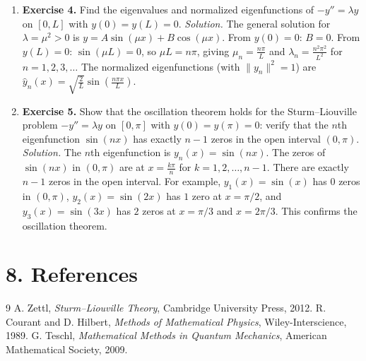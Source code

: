 \begin{enumerate}[leftmargin=*,itemsep=0.9em]
\item \textbf{Exercise 4.} Find the eigenvalues and normalized eigenfunctions of $-y'' = \lambda y$ on $[0, L]$ with $y(0) = y(L) = 0$. \emph{Solution.} The general solution for $\lambda = \mu^2 > 0$ is $y = A\sin(\mu x) + B\cos(\mu x)$. From $y(0) = 0$: $B = 0$. From $y(L) = 0$: $\sin(\mu L) = 0$, so $\mu L = n\pi$, giving $\mu_n = \frac{n\pi}{L}$ and $\lambda_n = \frac{n^2\pi^2}{L^2}$ for $n = 1, 2, 3, \ldots$ The normalized eigenfunctions (with $\|y_n\|^2 = 1$) are $\hat{y}_n(x) = \sqrt{\frac{2}{L}}\sin\!\left(\frac{n\pi x}{L}\right)$.

\item \textbf{Exercise 5.} Show that the oscillation theorem holds for the Sturm--Liouville problem $-y'' = \lambda y$ on $[0, \pi]$ with $y(0) = y(\pi) = 0$: verify that the $n$th eigenfunction $\sin(nx)$ has exactly $n - 1$ zeros in the open interval $(0, \pi)$. \emph{Solution.} The $n$th eigenfunction is $y_n(x) = \sin(nx)$. The zeros of $\sin(nx)$ in $(0, \pi)$ are at $x = \frac{k\pi}{n}$ for $k = 1, 2, \ldots, n - 1$. There are exactly $n - 1$ zeros in the open interval. For example, $y_1(x) = \sin(x)$ has $0$ zeros in $(0,\pi)$, $y_2(x) = \sin(2x)$ has $1$ zero at $x = \pi/2$, and $y_3(x) = \sin(3x)$ has $2$ zeros at $x = \pi/3$ and $x = 2\pi/3$. This confirms the oscillation theorem.

\end{enumerate}
\section*{8. References}
\begin{thebibliography}{9}
 A. Zettl, \emph{Sturm--Liouville Theory}, Cambridge University Press, 2012.
 R. Courant and D. Hilbert, \emph{Methods of Mathematical Physics}, Wiley-Interscience, 1989.
 G. Teschl, \emph{Mathematical Methods in Quantum Mechanics}, American Mathematical Society, 2009.
\end{thebibliography}
